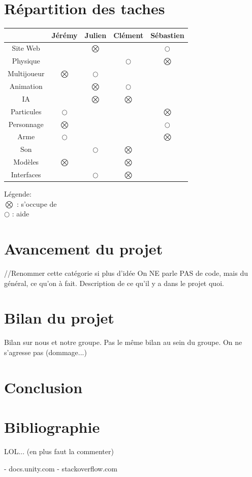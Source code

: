 ﻿\documentclass[12pt]{article}
\begin{document}
\section{Répartition des taches}
\begin{tabular}{|c|c|c|c|c|}
\hline
			&	Jérémy		&	Julien		&	Clément		&	Sébastien	\\ \hline
Site Web	&				& $\bigotimes$	& 				& $\bigcirc$	\\ \hline
Physique	&				&				& $\bigcirc$	& $\bigotimes$	\\ \hline
Multijoueur	& $\bigotimes$	& $\bigcirc$	&				& 				\\ \hline
Animation	&				& $\bigotimes$	& $\bigcirc$	&				\\ \hline
IA			& 				& $\bigotimes$	& $\bigotimes$	&				\\ \hline
Particules	& $\bigcirc$	& 				&				& $\bigotimes$	\\ \hline
Personnage	& $\bigotimes$	&				& 				& $\bigcirc$	\\ \hline
Arme		& $\bigcirc$	&				&				& $\bigotimes$	\\ \hline
Son			&				& $\bigcirc$	& $\bigotimes$	&				\\ \hline
Modèles		& $\bigotimes$	&				& $\bigotimes$	&				\\ \hline
Interfaces	& 				& $\bigcirc$	& $\bigotimes$	&				\\ \hline
\end{tabular}

Légende:\\
$\bigotimes$ : s'occupe de\\
$\bigcirc$ : aide

\section{Avancement du projet}//Renommer cette catégorie si plus d'idée
On NE parle PAS de code, mais du général, ce qu'on à fait.
Description de ce qu'il y a dans le projet quoi.


\section{Bilan du projet}
Bilan sur nous et notre groupe.
Pas le même bilan au sein du groupe.
On ne s'agresse pas (dommage...)

\section{Conclusion}

\section{Bibliographie}
LOL... (en plus faut la commenter)

- docs.unity.com
- stackoverflow.com
\end{document}
